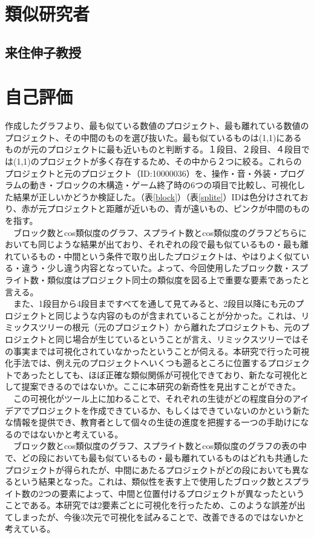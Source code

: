 \documentclass[a4paper,10pt,onecolumn,oneside,openany]{jsbook}
\begin{document}
\section{類似研究者}
\subsection{来住伸子教授}
\section{自己評価}
作成したグラフより、最も似ている数値のプロジェクト、最も離れている数値のプロジェクト、その中間のものを選び抜いた。最も似ているものは(1,1)にあるものが元のプロジェクトに最も近いものと判断する。１段目、２段目、４段目では(1,1)のプロジェクトが多く存在するため、その中から２つに絞る。これらのプロジェクトと元のプロジェクト（ID:10000036）を、操作・音・外装・プログラムの動き・ブロックの木構造・ゲーム終了時の6つの項目で比較し、可視化した結果が正しいかどうか検証した。（表\ref{block}）（表\ref{splite}）IDは色分けされており、赤が元プロジェクトと距離が近いもの、青が遠いもの、ピンクが中間のものを指す。
\\
　ブロック数とcos類似度のグラフ、スプライト数とcos類似度のグラフどちらにおいても同じような結果が出ており、それぞれの段で最も似ているもの・最も離れているもの・中間という条件で取り出したプロジェクトは、やはりよく似ている・違う・少し違う内容となっていた。よって、今回使用したブロック数・スプライト数・類似度はプロジェクト同士の類似度を図る上で重要な要素であったと言える。
\\
　また、1段目から4段目まですべてを通して見てみると、2段目以降にも元のプロジェクトと同じような内容のものが含まれていることが分かった。これは、リミックスツリーの根元（元のプロジェクト）から離れたプロジェクトも、元のプロジェクトと同じ場合が生じているということが言え、リミックスツリーではその事実までは可視化されていなかったということが伺える。本研究で行った可視化手法では、例え元のプロジェクトへいくつも遡るところに位置するプロジェクトであったとしても、ほぼ正確な類似関係が可視化できており、新たな可視化として提案できるのではないか。ここに本研究の新奇性を見出すことができた。
\\
　この可視化がツール上に加わることで、それぞれの生徒がどの程度自分のアイデアでプロジェクトを作成できているか、もしくはできていないのかという新たな情報を提供でき、教育者として個々の生徒の進度を把握する一つの手助けになるのではないかと考えている。
\\
　ブロック数とcos類似度のグラフ、スプライト数とcos類似度のグラフの表の中で、どの段においても最も似ているもの・最も離れているものはどれも共通したプロジェクトが得られたが、中間にあたるプロジェクトがどの段においても異なるという結果となった。これは、類似性を表す上で使用したブロック数とスプライト数の2つの要素によって、中間と位置付けるプロジェクトが異なったということである。本研究では2要素ごとに可視化を行ったため、このような誤差が出てしまったが、今後3次元で可視化を試みることで、改善できるのではないかと考えている。
\end{document}
